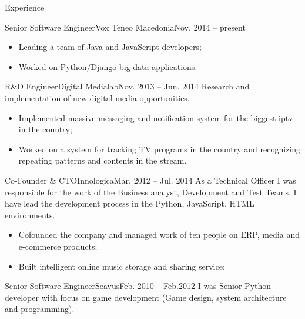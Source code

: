 \documentclass[]{mcdowellcv}
\begin{document}
    \begin{cvsection}{Experience}
    \label{Employment Record}
        \begin{cvsubsection}{Senior Software Engineer}{Vox Teneo Macedonia}{Nov. 2014 -- present}
            \begin{itemize}
                \item Leading a team of Java and JavaScript developers;
                \item Worked on Python/Django big data applications.
            \end{itemize}
        \end{cvsubsection}
        \begin{cvsubsection}{R\&D Engineer}{Digital Medialab}{Nov. 2013 -- Jun. 2014}
            Research and implementation of new digital media opportunities.
            \begin{itemize}
                \item Implemented massive messaging and notification system for the biggest iptv in the country;
                \item Worked on a system for tracking TV programs in the country and recognizing repeating patterns and contents in the stream.
            \end{itemize}
        \end{cvsubsection}
        \begin{cvsubsection}{Co-Founder \& CTO}{Innologica}{Mar. 2012 -- Jul. 2014}
            As a Technical Officer I was responsible for the work of the Business analyst, Development and Test Teams.\linebreak
            I have lead the development process in the Python, JavaScript, HTML environments.
            \begin{itemize}
                \item Cofounded the company and managed work of ten people on ERP, media and e-commerce products;
                \item Built intelligent online music storage and sharing service;
            \end{itemize}
        \end{cvsubsection}
        \begin{cvsubsection}{Senior Software Engineer}{Seavus}{Feb. 2010 -- Feb.2012}
            I was Senior Python developer with focus on game development (Game design, system architecture and programming).
            \begin{itemize}

\end{itemize}
\end{cvsubsection}
\end{cvsection}
\end{document}
